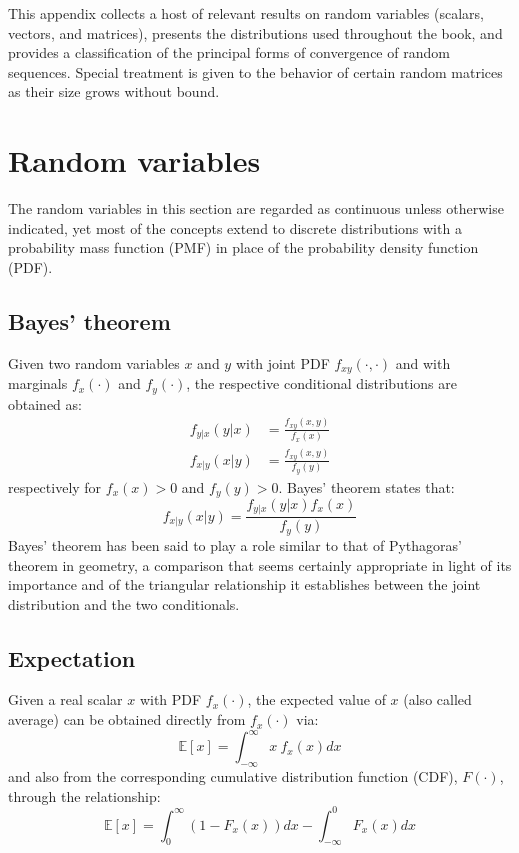 \documentclass[a4paper, 12pt]{book}
\begin{document}
\begin{purplebox}
This appendix collects a host of relevant results on random variables (scalars, vectors, and matrices), presents the distributions used throughout the book, and provides a classification of the principal forms of convergence of random sequences. Special treatment is given to the behavior of certain random matrices as their size grows without bound.
\end{purplebox}

\section{Random variables}

The random variables in this section are regarded as continuous unless otherwise indicated, yet most of the concepts extend to discrete distributions with a probability mass function (PMF) in place of the probability density function (PDF).

\subsection{Bayes' theorem}
Given two random variables $x$ and $y$ with joint PDF $f_{xy}(\cdot,\cdot)$ and with marginals $f_{x}(\cdot)$ and $f_{y}(\cdot)$, the respective conditional distributions are obtained as:
\begin{align}
    f_{y|x}(y|x) &= \frac{f_{xy}(x,y)}{f_{x}(x)} \tag{C.1} \\
    f_{x|y}(x|y) &= \frac{f_{xy}(x,y)}{f_{y}(y)} \tag{C.2}
\end{align}
respectively for $f_{x}(x)>0$ and $f_{y}(y)>0$. Bayes' theorem states that:
\begin{equation}
    f_{x|y}(x|y) = \frac{f_{y|x}(y|x)f_{x}(x)}{f_{y}(y)} \tag{C.3}
\end{equation}
Bayes' theorem has been said to play a role similar to that of Pythagoras' theorem in geometry, a comparison that seems certainly appropriate in light of its importance and of the triangular relationship it establishes between the joint distribution and the two conditionals.

\subsection{Expectation}
Given a real scalar $x$ with PDF $f_{x}(\cdot)$, the expected value of $x$ (also called average) can be obtained directly from $f_{x}(\cdot)$ via:
\begin{equation}
    \mathbb{E}[x] = \int_{-\infty}^{\infty} x~f_{x}(x)dx \tag{C.4}
\end{equation}
and also from the corresponding cumulative distribution function (CDF), $F(\cdot)$, through the relationship:
\begin{equation}
    \mathbb{E}[x] = \int_{0}^{\infty}(1-F_{x}(x))dx - \int_{-\infty}^{0}F_{x}(x)dx \tag{C.5}
\end{equation}
\end{document}
